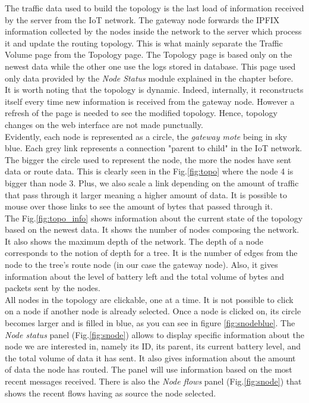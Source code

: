 The traffic data used to build the topology is the last load of information received by the server from the IoT network. The gateway node forwards the IPFIX information collected by the nodes inside the network to the server which process it and update the routing topology. This is what mainly separate the Traffic Volume page from the Topology page. The Topology page is based only on the newest data while the other one use the logs stored in database. This page used only data provided by the \textit{Node Status} module explained in the chapter before.\\

It is worth noting that the topology is dynamic. Indeed, internally, it reconstructs itself every time new information is received from the gateway node. However a refresh of the page is needed to see the modified topology. Hence, topology changes on the web interface are not made punctually. \\

Evidently, each node is represented as a circle, the \textit{gateway mote} being in sky blue. Each grey link represents a connection "parent to child" in the IoT network. The bigger the circle used to represent the node, the more the nodes have sent data or route data. This is clearly seen in the Fig.\ref{fig:topo} where the node 4 is bigger than node 3. Plus, we also scale a link depending on the amount of traffic that pass through it larger meaning a higher amount of data. It is possible to mouse over those links to see the amount of bytes that passed through it.\\

The Fig.\ref{fig:topo_info} shows information about the current state of the topology based on the newest data. It shows the number of nodes composing the network. It also shows the maximum depth of the network. The depth of a node corresponds to the notion of depth for a tree. It is the number of edges from the node to the tree's route node (in our case the gateway node). Also, it gives information about the level of battery left and the total volume of bytes and packets sent by the nodes.\\

All nodes in the topology are clickable, one at a time. It is not possible to click on a node if another node is already selected. Once a node is clicked on, its circle becomes larger and is filled in blue, as you can see in figure \ref{fig:snodeblue}. The \textit{Node status} panel (Fig.\ref{fig:snode}) allows to display specific information about the node we are interested in, namely its ID, its parent, its current battery level, and the total volume of data it has sent. It also gives information about the amount of data the node has routed. The panel will use information based on the most recent messages received. There is also the \textit{Node flows} panel (Fig.\ref{fig:snode}) that shows the recent flows having as source the node selected.\\


